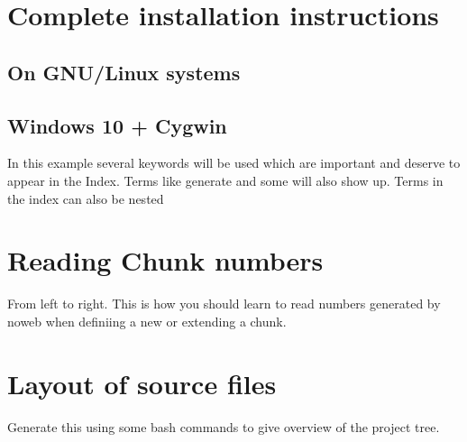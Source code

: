 \begin{appendices}
\renewcommand{\thesection}{\Roman{section}\;\;}
\section{Complete installation instructions}
\subsection{On GNU/Linux systems}
\blindtext
\subsection{Windows 10 + Cygwin}
In this example several keywords will be used 
which are important and deserve to appear in the Index.
Terms like generate and some will also 
show up. Terms in the index can also be nested 

\section{Reading Chunk numbers}

From left to right. This is how you should learn to read numbers generated 
by noweb when definiing a new or extending a chunk. 

\section{Layout of source files}
Generate this using some bash commands to give overview of the 
project tree. 


\end{appendices}
